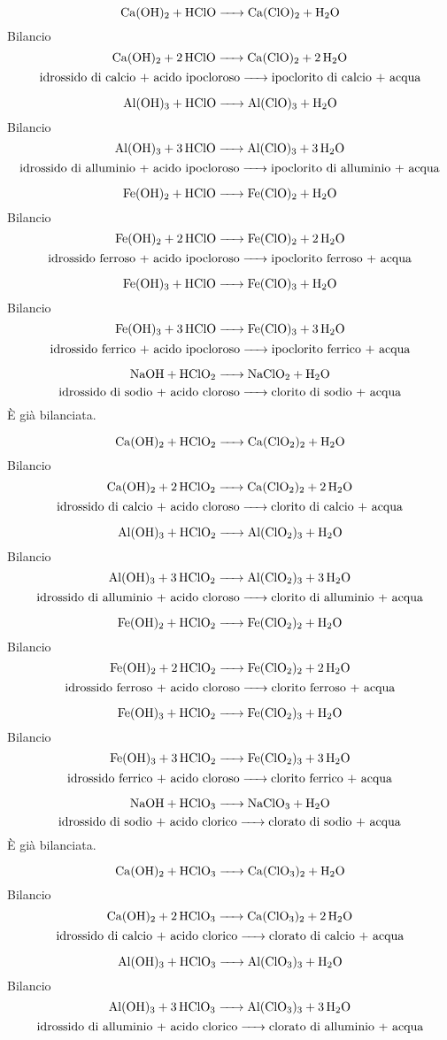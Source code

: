 $$\ce{Ca(OH)_2 + HClO -> Ca(ClO)_2 + H_2O}$$Bilancio
\newpage
$$\ce{Ca(OH)_2 + 2 HClO -> Ca(ClO)_2 + 2 H_2O}$$
$$\text{idrossido di calcio + acido ipocloroso}\ce{->}\text{ipoclorito di calcio + acqua}$$

$$\ce{Al(OH)_3 + HClO -> Al(ClO)_3 + H_2O}$$Bilancio
$$\ce{Al(OH)_3 + 3HClO -> Al(ClO)_3 + 3H_2O}$$
$$\text{idrossido di alluminio + acido ipocloroso}\ce{->}\text{ipoclorito di alluminio + acqua}$$

$$\ce{Fe(OH)_2 + HClO -> Fe(ClO)_2 + H_2O}$$Bilancio
$$\ce{Fe(OH)_2 + 2 HClO -> Fe(ClO)_2 + 2 H_2O}$$
$$\text{idrossido ferroso + acido ipocloroso}\ce{->}\text{ipoclorito ferroso + acqua}$$

$$\ce{Fe(OH)_3 + HClO -> Fe(ClO)_3 + H_2O}$$Bilancio
$$\ce{Fe(OH)_3 + 3 HClO -> Fe(ClO)_3 + 3 H_2O}$$
$$\text{idrossido ferrico + acido ipocloroso}\ce{->}\text{ipoclorito ferrico + acqua}$$

$$\ce{NaOH + HClO_2 -> NaClO_2 + H_2O}$$
$$\text{idrossido di sodio + acido cloroso}\ce{->}\text{clorito di sodio + acqua}$$
È già bilanciata.

$$\ce{Ca(OH)_2 + HClO_2 -> Ca(ClO_2)_2 + H_2O}$$Bilancio
$$\ce{Ca(OH)_2 + 2 HClO_2 -> Ca(ClO_2)_2 + 2 H_2O}$$
$$\text{idrossido di calcio + acido cloroso}\ce{->}\text{clorito di calcio + acqua}$$

$$\ce{Al(OH)_3 + HClO_2 -> Al(ClO_2)_3 + H_2O}$$Bilancio
$$\ce{Al(OH)_3 + 3HClO_2 -> Al(ClO_2)_3 + 3H_2O}$$
$$\text{idrossido di alluminio + acido cloroso}\ce{->}\text{clorito di alluminio + acqua}$$

$$\ce{Fe(OH)_2 + HClO_2 -> Fe(ClO_2)_2 + H_2O}$$Bilancio
$$\ce{Fe(OH)_2 + 2 HClO_2 -> Fe(ClO_2)_2 + 2 H_2O}$$
$$\text{idrossido ferroso + acido cloroso}\ce{->}\text{clorito ferroso + acqua}$$

$$\ce{Fe(OH)_3 + HClO_2 -> Fe(ClO_2)_3 + H_2O}$$Bilancio
$$\ce{Fe(OH)_3 + 3 HClO_2 -> Fe(ClO_2)_3 + 3 H_2O}$$
$$\text{idrossido ferrico + acido cloroso}\ce{->}\text{clorito ferrico + acqua}$$

$$\ce{NaOH + HClO_3 -> NaClO_3 + H_2O}$$
$$\text{idrossido di sodio + acido clorico}\ce{->}\text{clorato di sodio + acqua}$$
È già bilanciata.

$$\ce{Ca(OH)_2 + HClO_3 -> Ca(ClO_3)_2 + H_2O}$$Bilancio
$$\ce{Ca(OH)_2 + 2 HClO_3 -> Ca(ClO_3)_2 + 2 H_2O}$$
$$\text{idrossido di calcio + acido clorico}\ce{->}\text{clorato di calcio + acqua}$$

$$\ce{Al(OH)_3 + HClO_3 -> Al(ClO_3)_3 + H_2O}$$Bilancio
$$\ce{Al(OH)_3 + 3 HClO_3 -> Al(ClO_3)_3 + 3 H_2O}$$
$$\text{idrossido di alluminio + acido clorico}\ce{->}\text{clorato di alluminio + acqua}$$

